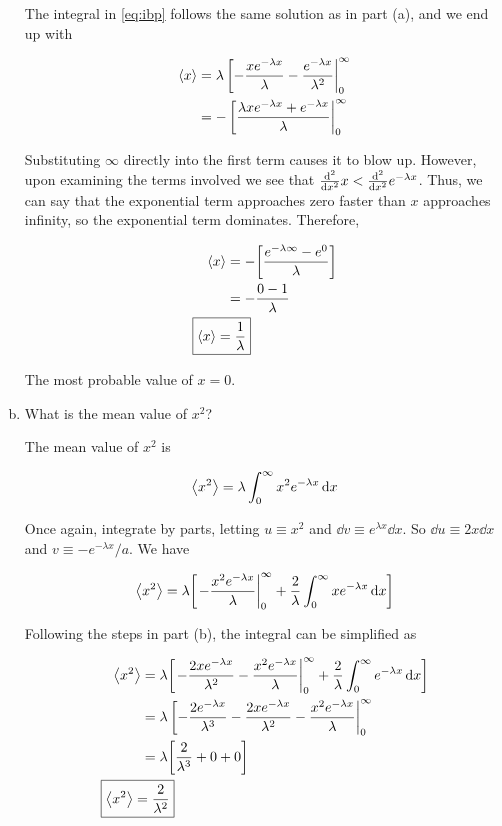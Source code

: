 \documentclass[9pt,a4paper,twocolumn]{article}
\begin{document}
\begin{enumerate}[(a)]
The integral in \eqref{eq:ibp} follows the same solution as in part (a), and we end up with

\begin{align}
	\ev{x} &= \lambda \eval[-\frac{xe^{-\lambda x}}{\lambda} - \frac{e^{-\lambda x}}{\lambda^2}|_0^\infty \nonumber \\
	&= -\eval[\frac{\lambda xe^{-\lambda x} + e^{-\lambda x}}{\lambda}|_0^\infty
\end{align}

Substituting $\infty$ directly into the first term causes it to blow up. However, upon examining the terms involved we see that $\dv[2]{x}x < \dv[2]{x}e^{-\lambda x}$. Thus, we can say that the exponential term approaches zero faster than $x$ approaches infinity, so the exponential term dominates. Therefore,

\begin{align}
	\ev{x} &= -\qty[\frac{e^{-\lambda\infty} - e^0}{\lambda}] \nonumber \\
	&= -\frac{0 - 1}{\lambda} \nonumber \\
	\Aboxed{
		\ev{x} &= \frac{1}{\lambda}
	} \label{eq:answer-b}
\end{align}

The most probable value of $\boxed{x = 0}$.

\item What is the mean value of $x^2$?

The mean value of $x^2$ is

\begin{equation}
	\ev{x^2} = \lambda\int_0^\infty x^2 e^{-\lambda x}\dd{x}
\end{equation}

Once again, integrate by parts, letting $u \equiv x^2$ and $\dd{v} \equiv e^{\lambda x}\dd{x}$. So $\dd{u} \equiv 2x\dd{x}$ and $v \equiv -e^{-\lambda x}/a$. We have

\begin{equation}
	\ev{x^2} = \lambda\qty[\eval{-\frac{x^2 e^{-\lambda x}}{\lambda}}_0^\infty + \frac{2}{\lambda}\int_0^\infty xe^{-\lambda x}\dd{x}]
\end{equation}

Following the steps in part (b), the integral can be simplified as

\begin{align}
	\ev{x^2} &= \lambda \qty[\eval{-\frac{2xe^{-\lambda x}}{\lambda^2} - \frac{x^2 e^{-\lambda x}}{\lambda}}_0^\infty + \frac{2}{\lambda}\int_0^\infty e^{-\lambda x}\dd{x}] \nonumber \\
	&= \lambda \eval[-\frac{2e^{-\lambda x}}{\lambda^3} - \frac{2xe^{-\lambda x}}{\lambda^2} - \frac{x^2 e^{-\lambda x}}{\lambda}|_0^\infty \nonumber \\
	&= \lambda\qty[\frac{2}{\lambda^3} + 0 + 0] \nonumber \\
	\Aboxed{
		\ev{x^2} &= \frac{2}{\lambda^2}
	} \label{eq:answer-c}
\end{align}


\end{enumerate}
\end{document}
